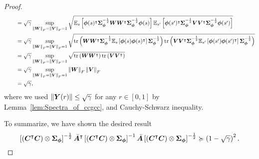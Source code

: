 \begin{proof}
\begin{equation*}
\begin{aligned}
         &\qquad = \sqrt\gamma\sup_{\left\|{{\bm{W}}}\right\|_F=\left\|{{\bm{V}}}\right\|_F=1}\sqrt{{\mathbb E}_{s }\left[{{\bm{\phi}}(s)^{\intercal}{\bm{\Sigma}}_{{\bm{\phi}}}^{-\frac{1}{2}}{\bm{W}}{\bm{W}}^{\intercal}{\bm{\Sigma}}_{{\bm{\phi}}}^{-\frac{1}{2}}{\bm{\phi}}(s)  }\right]  {\mathbb E}_{ s^\prime}\left[{{\bm{\phi}}(s^\prime)^{\intercal}{\bm{\Sigma}}_{{\bm{\phi}}}^{-\frac{1}{2}}{\bm{V}}{\bm{V}}^{\intercal}{\bm{\Sigma}}_{{\bm{\phi}}}^{-\frac{1}{2}}{\bm{\phi}}(s^\prime) }\right]}\\
         &\qquad = \sqrt\gamma\sup_{\left\|{{\bm{W}}}\right\|_F=\left\|{{\bm{V}}}\right\|_F=1}\sqrt{\operatorname{tr}\left({{\bm{W}}{\bm{W}}^{\intercal}{\bm{\Sigma}}_{{\bm{\phi}}}^{-\frac{1}{2}}{\mathbb E}_{s }\left[{{\bm{\phi}}(s){\bm{\phi}}(s)^{\intercal}}\right]{\bm{\Sigma}}_{{\bm{\phi}}}^{-\frac{1}{2}}}\right)   \operatorname{tr}\left({{\bm{V}}{\bm{V}}^{\intercal}{\bm{\Sigma}}_{{\bm{\phi}}}^{-\frac{1}{2}}{\mathbb E}_{s^\prime }\left[{{\bm{\phi}}(s^\prime){\bm{\phi}}(s^\prime)^{\intercal}}\right]{\bm{\Sigma}}_{{\bm{\phi}}}^{-\frac{1}{2}}}\right)}\\
         &\qquad = \sqrt\gamma\sup_{\left\|{{\bm{W}}}\right\|_F=\left\|{{\bm{V}}}\right\|_F=1}\sqrt{\operatorname{tr}\left({{\bm{W}}{\bm{W}}^{\intercal}}\right)   \operatorname{tr}\left({{\bm{V}}{\bm{V}}^{\intercal}}\right)}\\
         &\qquad = \sqrt\gamma\sup_{\left\|{{\bm{W}}}\right\|_F=\left\|{{\bm{V}}}\right\|_F=1}\left\|{{\bm{W}}}\right\|_F\left\|{{\bm{V}}}\right\|_F\\
        &\qquad = \sqrt\gamma,
\end{aligned}
\end{equation*}
where we used $\left\|{{\bm{Y}}(r)}\right\|\leq \sqrt\gamma$ for any $r\in[0,1]$ by Lemma~\ref{lem:Spectra_of_ccgcc}, and Cauchy-Schwarz inequality.

To summarize, we have shown the desired result
\begin{equation*}
    \left[{\left({{\bm{C}}^{\intercal}{\bm{C}}}\right)\otimes{\bm{\Sigma}}_{{\bm{\phi}}}}\right]^{-\frac{1}{2}}\bar{{\bm{A}}}^{\intercal}\left[{\left({{\bm{C}}^{\intercal}{\bm{C}}}\right)\otimes{\bm{\Sigma}}_{{\bm{\phi}}}}\right]^{-1}\bar{{\bm{A}}}\left[{\left({{\bm{C}}^{\intercal}{\bm{C}}}\right)\otimes{\bm{\Sigma}}_{{\bm{\phi}}}}\right]^{-\frac{1}{2}}\succcurlyeq \left({1-\sqrt\gamma}\right)^2.
\end{equation*}
\end{proof}

